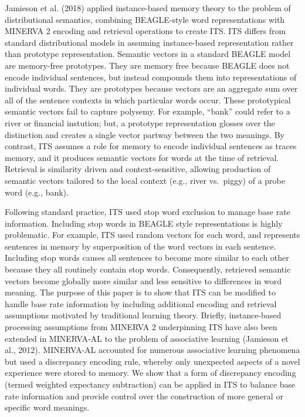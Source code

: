 \documentclass[
  jou]{apa6}
\begin{document}
Jamieson et al. (2018) applied instance-based memory theory to the problem of distributional semantics, combining BEAGLE-style word representations with MINERVA 2 encoding and retrieval operations to create ITS. ITS differs from standard distributional models in assuming instance-based representation rather than prototype representation. Semantic vectors in a standard BEAGLE model are memory-free prototypes. They are memory free because BEAGLE does not encode individual sentences, but instead compounds them into representations of individual words. They are prototypes because vectors are an aggregate sum over all of the sentence contexts in which particular words occur. These prototypical semantic vectors fail to capture polysemy. For example, ``bank'' could refer to a river or financial instution; but, a prototype representation glosses over the distinction and creates a single vector partway between the two meanings. By contrast, ITS assumes a role for memory to encode individual sentences as traces memory, and it produces semantic vectors for words at the time of retrieval. Retrieval is similarity driven and context-sensitive, allowing production of semantic vectors tailored to the local context (e.g., river vs.~piggy) of a probe word (e.g., bank).

Following standard practice, ITS used stop word exclusion to manage base rate information. Including stop words in BEAGLE style representations is highly problematic. For example, ITS used random vectors for each word, and represents sentences in memory by superposition of the word vectors in each sentence. Including stop words causes all sentences to become more similar to each other because they all routinely contain stop words. Consequently, retrieved semantic vectors become globally more similar and less sensitive to differences in word meaning. The purpose of this paper is to show that ITS can be modified to handle base rate information by including additional encoding and retrieval assumptions motivated by traditional learning theory. Briefly, instance-based processing assumptions from MINERVA 2 underpinning ITS have also been extended in MINERVA-AL to the problem of associative learning (Jamieson et al., 2012). MINERVA-AL accounted for numerous associative learning phenomena but used a discrepancy encoding rule, whereby only unexpected aspects of a novel experience were stored to memory. We show that a form of discrepancy encoding (termed weighted expectancy subtraction) can be applied in ITS to balance base rate information and provide control over the construction of more general or specific word meanings.
\end{document}
